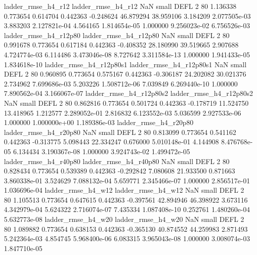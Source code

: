       ladder_rmse_h4_r12       ladder_rmse_h4_r12                   NaN      small     DEFL                 2 80 1.136338       0.773654 0.614704       0.442363   -0.248624     46.879294     38.959106     3.184209   2.077505e-03  3.883203 2.127821e-04     4.564165   1.814654e-05            1.000000    9.256023e-02        6.756526e-03
   ladder_rmse_h4_r12p80    ladder_rmse_h4_r12p80                   NaN      small     DEFL                 2 80 0.991678       0.773654 0.617184       0.442363   -0.408352     28.180990     39.519665     2.907688   4.724774e-03  6.114486 3.473046e-08     8.727642   3.311584e-13            1.000000    1.941433e-05        1.834618e-10
 ladder_rmse_h4_r12p80s1  ladder_rmse_h4_r12p80s1                   NaN      small     DEFL                 2 80 0.960895       0.773654 0.575167       0.442363   -0.306187     24.202082     30.021376     2.734962   7.699686e-03  5.203226 1.508712e-06     7.039849   6.269440e-10            1.000000    7.890562e-04        3.166067e-07
 ladder_rmse_h4_r12p80s2  ladder_rmse_h4_r12p80s2                   NaN      small     DEFL                 2 80 0.862816       0.773654 0.501724       0.442363   -0.178719     11.524750     13.418965     1.212577   2.289052e-01  2.816832 6.123552e-03     5.036599   2.927533e-06            1.000000    1.000000e+00        1.189386e-03
   ladder_rmse_h4_r20p80    ladder_rmse_h4_r20p80                   NaN      small     DEFL                 2 80 0.813099       0.773654 0.541162       0.442363   -0.313775      5.098443     22.334247     0.676000   5.010148e-01  4.144908 8.476768e-05     6.134434   3.190367e-08            1.000000    3.924743e-02        1.499472e-05
   ladder_rmse_h4_r40p80    ladder_rmse_h4_r40p80                   NaN      small     DEFL                 2 80 0.828434       0.773654 0.539389       0.442363   -0.292842      7.080608     21.933500     0.871663   3.860338e-01  3.524629 7.088132e-04     5.659771   2.345466e-07            1.000000    2.856517e-01        1.036696e-04
      ladder_rmse_h4_w12       ladder_rmse_h4_w12                   NaN      small     DEFL                 2 80 1.105513       0.773654 0.647615       0.442363   -0.397561     42.894946     46.398922     3.673116   4.342979e-04  5.624322 2.716074e-07     7.435334   1.087408e-10            0.252761    1.480260e-04        5.632773e-08
      ladder_rmse_h4_w20       ladder_rmse_h4_w20                   NaN      small     DEFL                 2 80 1.089882       0.773654 0.638153       0.442363   -0.365130     40.874552     44.259983     2.871493   5.242364e-03  4.854745 5.968400e-06     6.083315   3.965043e-08            1.000000    3.008074e-03        1.847710e-05
